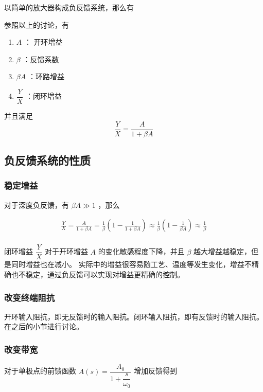\documentclass[cn,11pt,chinese,black,simple]{../elegantbook}
\begin{document}
以简单的放大器构成负反馈系统，那么有


参照以上的讨论，有

\begin{enumerate}
    \item \(A\) ： 开环增益
    \item \(\beta\) ：反馈系数
    \item \(\beta A\) ：环路增益
    \item \(\dfrac{Y}{X}\) ：闭环增益
\end{enumerate}

并且满足 \[\dfrac{Y}{X} = \dfrac{A}{1 + \beta A}\]

\subsection{负反馈系统的性质}

\subsubsection{稳定增益}

对于深度负反馈，有 \(\beta A \gg 1\) ，那么

\[\begin{array}{c}
    \frac{Y}{X}=\frac{A}{1+\beta A}=\frac{1}{\beta}\left(1-\frac{1}{1+\beta A}\right) \approx \frac{1}{\beta}\left(1-\frac{1}{\beta A}\right) \approx \frac{1}{\beta} \\
\end{array}\]

闭环增益 \(\dfrac{Y}{X}\) 对于开环增益 \(A\) 的变化敏感程度下降，并且 \(\beta\) 越大增益越稳定，但是同时增益也在减小。
实际中的增益很容易随工艺、温度等发生变化，增益不精确也不稳定，通过负反馈可以实现对增益更精确的控制。

\subsubsection{改变终端阻抗}

开环输入阻抗，即无反馈时的输入阻抗。闭环输入阻抗，即有反馈时的输入阻抗。在之后的小节进行讨论。



\subsubsection{改变带宽}

对于单极点的前馈函数 \(A(s) = \dfrac{A_0}{1 + \dfrac{s}{\omega_0}}\)  增加反馈得到
\end{document}
